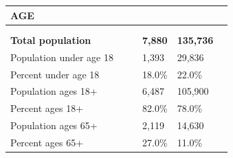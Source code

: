 \documentclass[9pt]{report}
\begin{document}
\vspace{24pt}
\setlength{\tabcolsep}{.01in} %
\begin{tabular}{p{.10in}p{.10in}p{.10in}p{3.7in}>{\hfill}p{.85in}>{\hfill}p{.85in}>{\hfill}p{.85in}>{\hfill}p{.85in}p{0.1in}}
\multicolumn{9}{l}{\parbox{7.1in}{\raggedright{\large{\strut\textbf{AGE}\strut}}}} \\ 
\hline
\multicolumn{4}{l}{\parbox{3.5in}{\raggedright{\textbf{}}}} & \multicolumn{1}{r}{\parbox{.85in}{\strut\raggedleft{\textbf{}\strut}}} & \multicolumn{1}{r}{\parbox{.85in}{\strut\raggedleft{\textbf{}\strut}}} & \multicolumn{1}{r}{\parbox{.85in}{\strut{}}} & \multicolumn{1}{r}{\parbox{.85in}{\strut{}}} & \\ 
\multicolumn{9}{l}{} \\ 
\multicolumn{4}{l}{\parbox{3.5in}{\strut\raggedright{\textbf{Total population}\strut}}} & \textbf{} & \textbf{} & \textbf{7,880} & \textbf{135,736} & \textbf{} \\ 
\multicolumn{4}{l}{\parbox{3.6in}{\strut\raggedright{{Population under age 18}}\strut}} &  &  & 1,393 & 29,836 & \multicolumn{1}{l}{}  \\ 
\multicolumn{4}{l}{\parbox{3.6in}{\strut\raggedright{{Percent under age 18}}\strut}} &  &  & 18.0\% & 22.0\% & \multicolumn{1}{l}{}  \\ 
\multicolumn{4}{l}{\parbox{3.6in}{\strut\raggedright{{Population ages 18+}}\strut}} &  &  & 6,487 & 105,900 & \multicolumn{1}{l}{}  \\ 
\multicolumn{4}{l}{\parbox{3.6in}{\strut\raggedright{{Percent ages 18+}}\strut}} &  &  & 82.0\% & 78.0\% & \multicolumn{1}{l}{}  \\ 
\multicolumn{4}{l}{\parbox{3.6in}{\strut\raggedright{{Population ages 65+}}\strut}} &  &  & 2,119 & 14,630 & \multicolumn{1}{l}{}  \\ 
\multicolumn{4}{l}{\parbox{3.6in}{\strut\raggedright{{Percent ages 65+}}\strut}} &  &  & 27.0\% & 11.0\% & \multicolumn{1}{l}{}  \\ 

\end{tabular}
\setlength{\tabcolsep}{6pt} %
\end{document}
